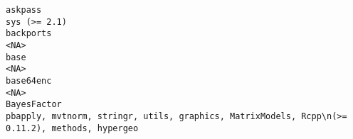 \documentclass[
  letterpaper,
  DIV=11,
  numbers=noendperiod]{scrreprt}
\begin{document}
\begin{verbatim}
askpass                                                                                                                                                                                                                                                                                                                                                                                                                                                                                                                                                                                                       sys (>= 2.1)
backports                                                                                                                                                                                                                                                                                                                                                                                                                                                                                                                                                                                                             <NA>
base                                                                                                                                                                                                                                                                                                                                                                                                                                                                                                                                                                                                                  <NA>
base64enc                                                                                                                                                                                                                                                                                                                                                                                                                                                                                                                                                                                                             <NA>
BayesFactor                                                                                                                                                                                                                                                                                                                                                                                                                                                                                                                 pbapply, mvtnorm, stringr, utils, graphics, MatrixModels, Rcpp\n(>= 0.11.2), methods, hypergeo

\end{verbatim}
\end{document}
